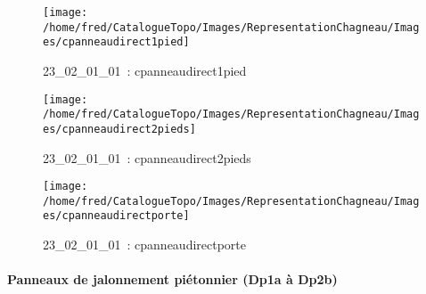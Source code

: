 \documentclass[12pt,titlepage]{book}
\begin{document}
\begin{figure}[h!]
  \hfill         %
  \begin{minipage}[t]{3cm}
    \begin{center}
      \texttt{[image: /home/fred/CatalogueTopo/Images/RepresentationChagneau/Images/cpanneaudirect1pied]}
      \caption[~23\_02\_01\_01]{\small{23\_02\_01\_01~:} \tiny{cpanneaudirect1pied}}\label{cpanneaudirect1pied}
    \end{center}
  \end{minipage}
  \begin{minipage}[t]{3cm}
    \begin{center}
      \texttt{[image: /home/fred/CatalogueTopo/Images/RepresentationChagneau/Images/cpanneaudirect2pieds]}
      \caption[~23\_02\_01\_01]{\small{23\_02\_01\_01~:} \tiny{cpanneaudirect2pieds}}\label{cpanneaudirect2pieds}
    \end{center}
  \end{minipage}
  \begin{minipage}[t]{3cm}
    \begin{center}
      \texttt{[image: /home/fred/CatalogueTopo/Images/RepresentationChagneau/Images/cpanneaudirectporte]}
      \caption[~23\_02\_01\_01]{\small{23\_02\_01\_01~:} \tiny{cpanneaudirectporte}}\label{cpanneaudirectporte}
    \end{center}
  \end{minipage}
\end{figure}


\paragraph{Panneaux de jalonnement piétonnier (Dp1a à Dp2b)}
\noindent
\vspace{\baselineskip}
\end{document}
